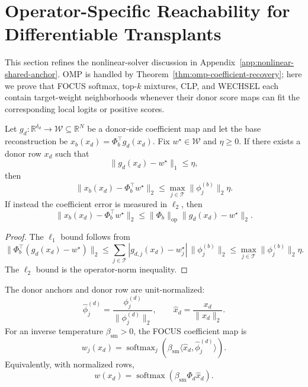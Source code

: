 \section{Operator-Specific Reachability for Differentiable Transplants}
\label{app:operator-specific-reachability}

This section refines the nonlinear-solver discussion in Appendix~\ref{app:nonlinear-shared-anchor}. OMP is handled by Theorem~\ref{thm:omp-coefficient-recovery}; here we prove that FOCUS softmax, top-$k$ mixtures, CLP, and WECHSEL each contain target-weight neighborhoods whenever their donor score maps can fit the corresponding local logits or positive scores.

\begin{theorem}
\label{thm:operator-class-reachability}
Let $g_d:\mathbb{R}^{\delta_d}\to\mathcal{W}\subseteq\mathbb{R}^{N}$ be a donor-side coefficient map and let the base reconstruction be $x_b(x_d)=\Phi_b^\top g_d(x_d)$. Fix $w^\star\in\mathcal{W}$ and $\eta\ge 0$. If there exists a donor row $x_d$ such that
\[
\|g_d(x_d)-w^\star\|_1\le \eta,
\]
then
\[
\|x_b(x_d)-\Phi_b^\top w^\star\|_2
\le
\max_{j\in\mathcal{T}}\|\phi_j^{(b)}\|_2\eta.
\]
If instead the coefficient error is measured in $\ell_2$, then
\[
\|x_b(x_d)-\Phi_b^\top w^\star\|_2
\le
\|\Phi_b\|_{\mathrm{op}}\|g_d(x_d)-w^\star\|_2.
\]
\end{theorem}

\begin{proof}
The $\ell_1$ bound follows from
\[
\|\Phi_b^\top(g_d(x_d)-w^\star)\|_2
\le
\sum_{j\in\mathcal{T}}|g_{d,j}(x_d)-w_j^\star|\,\|\phi_j^{(b)}\|_2
\le
\max_{j\in\mathcal{T}}\|\phi_j^{(b)}\|_2\eta.
\]
The $\ell_2$ bound is the operator-norm inequality.
\end{proof}

\begin{assumption}
\label{ass:softmax-attention-operator}
The donor anchors and donor row are unit-normalized:
\[
\widehat{\phi}^{(d)}_j=\frac{\phi^{(d)}_j}{\|\phi^{(d)}_j\|_2},
\qquad
\widehat{x}_d=\frac{x_d}{\|x_d\|_2}.
\]
For an inverse temperature $\beta_{\mathrm{sm}}>0$, the FOCUS coefficient map is
\[
w_j(x_d)=\operatorname{softmax}_j\left(\beta_{\mathrm{sm}}\langle \widehat{x}_d,\widehat{\phi}^{(d)}_j\rangle\right).
\]
Equivalently, with normalized rows,
\[
w(x_d)=\operatorname{softmax}(\beta_{\mathrm{sm}}\Phi_d\widehat{x}_d).
\]
\end{assumption}


